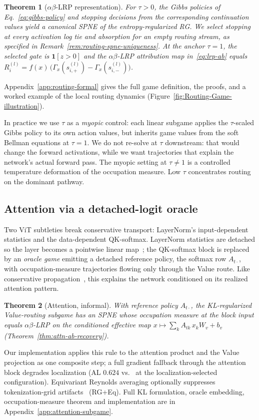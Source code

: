 \documentclass[twoside]{article}
\newif\ifch \chfalse
\newcommand{\ch}[1]{\ifch\textcolor{magenta}{#1}\else#1\fi}
\newcommand{\1}{\mathbf{1}}
\newtheorem{theorem}{Theorem}
\begin{document}
\begin{theorem}[$\alpha\beta$-\ac{LRP} representation]\label{thm:lrp-recovery}
For $\tau>0$, the Gibbs policies of Eq.~\eqref{eq:gibbs-policy} and stopping decisions from the corresponding continuation values yield a canonical SPNE of the entropy-regularized \ac{RG}. We select stopping at every activation log tie and absorption for an empty routing stream, as specified in Remark~\ref{rem:routing-spne-uniqueness}. At the anchor $\tau=1$, the selected gate is $\mathbf{1}[z>0]$ and the
$\alpha\beta$-\ac{LRP} attribution map in~\eqref{eq:lrp-ab} equals $R_i^{(l)} =
    f(x)\,\bigl(\Gamma_x(s_{i,+}^{(l)}) - \Gamma_x(s_{i,-}^{(l)})\bigr)$.
\end{theorem}
Appendix~\ref{app:routing-formal} gives the full game definition, the proofs, and a worked example
of the local routing dynamics (Figure~\ref{fig:Routing-Game-illustration}).

In practice we use $\tau$ as a \emph{myopic} control: each linear subgame applies the $\tau$-scaled
Gibbs policy to its own action values, but inherits game values from the soft Bellman equations at
$\tau{=}1$. We do not re-solve at $\tau$ downstream: that would change the forward activations,
while we want trajectories that explain the network's actual forward pass. The myopic setting at
$\tau\neq 1$ is a controlled temperature deformation of the occupation measure.
Low $\tau$ concentrates routing on the dominant pathway.

\subsection{Attention via a detached-logit oracle}\label{sec:attention}

Two \ac{ViT} subtleties break conservative transport: \ch{LayerNorm's input-dependent statistics}
and the data-dependent QK-softmax. LayerNorm statistics are detached so the layer becomes a pointwise linear
map~\citep{Ali2022, Wrobel2024}; the QK-softmax block is replaced by an \emph{oracle game} emitting
a detached reference policy, the softmax row $A_{t\cdot}$, with occupation-measure trajectories
flowing only through the Value route. \ch{Like conservative propagation~\citep{Ali2022}, this explains the network conditioned on its
realized attention pattern.}

\begin{theorem}[Attention, informal]\label{thm:attention}
With reference policy $A_{t\cdot}$, the KL-regularized Value-routing subgame has an SPNE whose
occupation measure at the block input equals $\alpha\beta$-\ac{LRP} on the conditioned effective
map $x \mapsto \sum_k A_{tk}\, x_k W_v + b_v$ (Theorem~\ref{thm:attn-ab-recovery}).
\end{theorem}
Our implementation applies this rule to the attention product and the Value projection as one
composite step; a full gradient fallback through the attention block degrades localization (AL
$0.624$ vs.\ \vitRGlocAL{} at the localization-selected configuration). Equivariant Reynolds
averaging optionally suppresses tokenization-grid artifacts~\citep{Wrobel2024} (\ac{RG}+Eq). Full
KL formulation, oracle embedding, occupation-measure theorem and implementation are in
Appendix~\ref{app:attention-subgame}.
\end{document}
